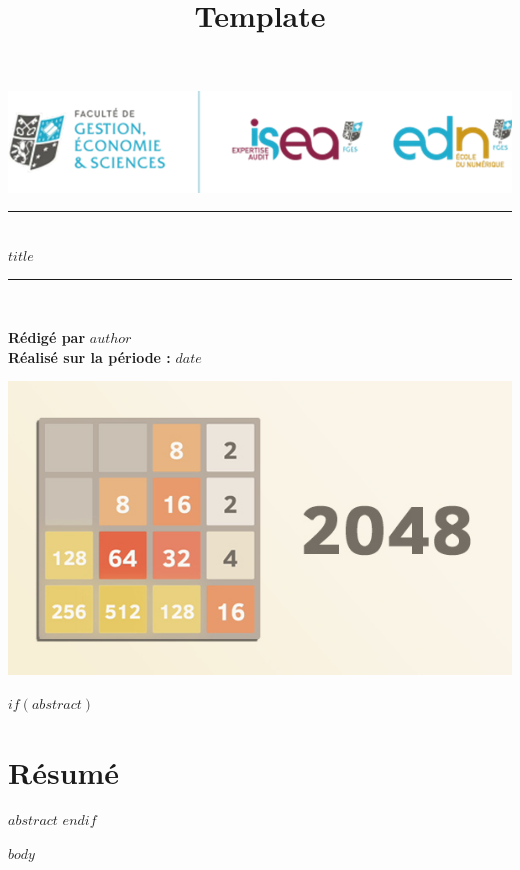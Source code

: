 \documentclass[12pt, a4paper]{article}
\title{Template}
\newcommand{\HRule}{\rule{\linewidth}{0.5mm}}
\newcommand{\mytitle}{$title$}
\newcommand{\myauthor}{$author$}
\newcommand{\mydate}{$date$} %
\begin{document}
	\begin{titlepage}
		\centering  
    
      	\includegraphics[width=0.7\linewidth]{fges.png}
       	\label{fig:fges}
        
        \begin{center}
            \HRule \\[0.4cm]
            {\LARGE \bfseries \mytitle \\[0.4cm]}
            \HRule \\[1cm]
        \end{center}
        
        {\large \bfseries Rédigé par} \myauthor \\
        {\large \bfseries Réalisé sur la période :} \mydate 
       
 
        
	        \includegraphics[width=1\linewidth]{2048.jpg}
        \label{fig:2048}
        
        
       
    	\thispagestyle{empty}
	\end{titlepage}

	
	
	\newpage
	
	$if(abstract)$
	\section*{Résumé}
	$abstract$
	\thispagestyle{empty}
	\clearpage
	$endif$
	

	\thispagestyle{empty}
	\tableofcontents
	
	\clearpage
	
	\newpage
	\setcounter{page}{1}
	
    $body$
	
	
\end{document}

